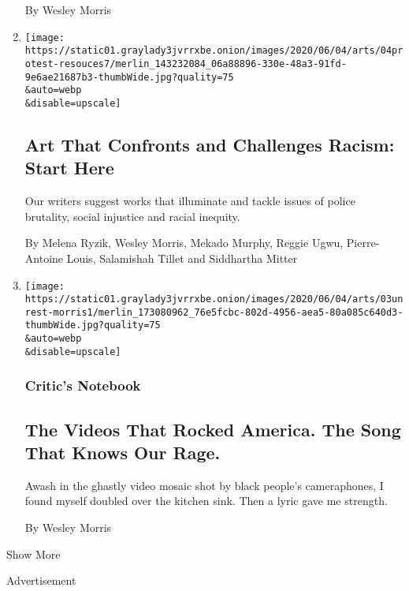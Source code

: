 \begin{enumerate}
  By Wesley Morris
\item
  \href{/2020/06/04/arts/racism-writings-books-movies.html}{}

  \texttt{[image: https://static01.graylady3jvrrxbe.onion/images/2020/06/04/arts/04protest-resouces7/merlin\_143232084\_06a88896-330e-48a3-91fd-9e6ae21687b3-thumbWide.jpg?quality=75\\\&auto=webp\\\&disable=upscale]}

  \hypertarget{art-that-confronts-and-challenges-racism-start-here}{%
  \subsection{Art That Confronts and Challenges Racism: Start
  Here}\label{art-that-confronts-and-challenges-racism-start-here}}

  Our writers suggest works that illuminate and tackle issues of police
  brutality, social injustice and racial inequity.

  By Melena Ryzik, Wesley Morris, Mekado Murphy, Reggie Ugwu,
  Pierre-Antoine Louis, Salamishah Tillet and Siddhartha Mitter
\item
  \href{/2020/06/03/arts/george-floyd-video-racism.html}{}

  \texttt{[image: https://static01.graylady3jvrrxbe.onion/images/2020/06/04/arts/03unrest-morris1/merlin\_173080962\_76e5fcbc-802d-4956-aea5-80a085c640d3-thumbWide.jpg?quality=75\\\&auto=webp\\\&disable=upscale]}

  \hypertarget{critics-notebook-1}{%
  \subsubsection{Critic's Notebook}\label{critics-notebook-1}}

  \hypertarget{the-videos-that-rocked-america-the-song-that-knows-our-rage}{%
  \subsection{The Videos That Rocked America. The Song That Knows Our
  Rage.}\label{the-videos-that-rocked-america-the-song-that-knows-our-rage}}

  Awash in the ghastly video mosaic shot by black people's cameraphones,
  I found myself doubled over the kitchen sink. Then a lyric gave me
  strength.

  By Wesley Morris
\end{enumerate}

Show More

Advertisement

